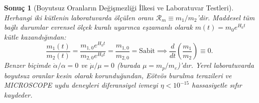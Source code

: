 \documentclass[11pt,a4paper]{article}
\newtheorem{corollary}{Sonuç}[theorem]
\begin{document}
\begin{corollary}[Boyutsuz Oranların Değişmezliği İlkesi ve Laboratuvar Testleri]
    \label{cor:boyutsuz_oranlar_sc}
    Herhangi iki kütlenin laboratuvarda ölçülen oranı $\mathcal{R}_m \equiv m_1 / m_2$'dir. Maddesel tüm bağlı durumlar evrensel ölçek kuralı uyarınca eşzamanlı olarak $m(t) = m_0 e^{H_0 t}$ kütle kazandığından:
    \begin{equation}
        \frac{m_1(t)}{m_2(t)} = \frac{m_{1,0} e^{H_0 t}}{m_{2,0} e^{H_0 t}} = \frac{m_{1,0}}{m_{2,0}} = \text{Sabit} \implies \frac{d}{dt}\left(\frac{m_1}{m_2}\right) \equiv 0.
        \label{eq:boyutsuz_oran_sc}
    \end{equation}
    Benzer biçimde $\dot{\alpha}/\alpha = 0$ ve $\dot{\mu}/\mu = 0$ (burada $\mu = m_p/m_e$)'dır. Yerel laboratuvarda boyutsuz oranlar kesin olarak korunduğundan, Eötvös burulma terazileri ve MICROSCOPE uydu deneyleri diferansiyel ivmeyi $\eta < 10^{-15}$ hassasiyetle sıfır kaydeder.
\end{corollary}
\end{document}
